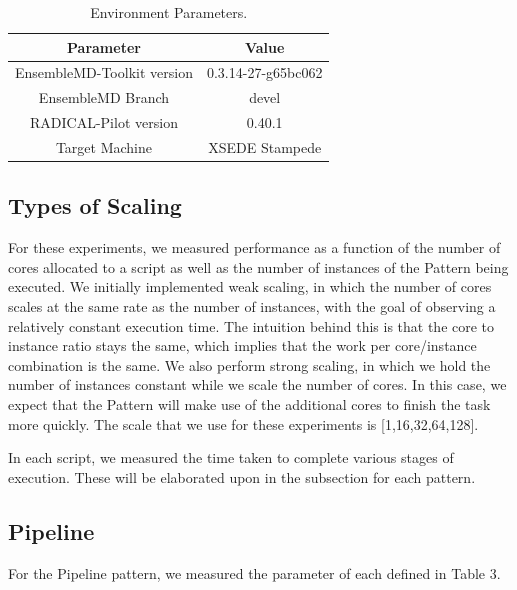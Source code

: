 \documentclass[]{article}
\begin{document}
		\begin{table}[h!]
			\centering
			\begin{tabular}{|c|c|}
					\hline
					Parameter & Value \\
					\hline
					\hline
					EnsembleMD-Toolkit version & 0.3.14-27-g65bc062 \\
					\hline
					EnsembleMD Branch & devel \\
					\hline
					RADICAL-Pilot version & 0.40.1 \\
					\hline
					Target Machine & XSEDE Stampede \\
					\hline
			\end{tabular}
			\caption{Environment Parameters.}
		\end{table}

	\subsection{Types of Scaling}
		For these experiments, we measured performance as a function of the number of cores allocated to a script as well as the number of instances of the Pattern being executed. We initially implemented weak scaling, in which the number of cores scales at the same rate as the number of instances, with the goal of observing a relatively constant execution time. The intuition behind this is that the core to instance ratio stays the same, which implies that the work per core/instance combination is the same. We also perform strong scaling, in which we hold the number of instances constant while we scale the number of cores. In this case, we expect that the Pattern will make use of the additional cores to finish the task more quickly. The scale that we use for these experiments is [1,16,32,64,128].

		In each script, we measured the time taken to complete various stages of execution. These will be elaborated upon in the subsection for each pattern.

	\subsection{Pipeline}
		For the Pipeline pattern, we measured the parameter of each defined in Table 3.
\end{document}
